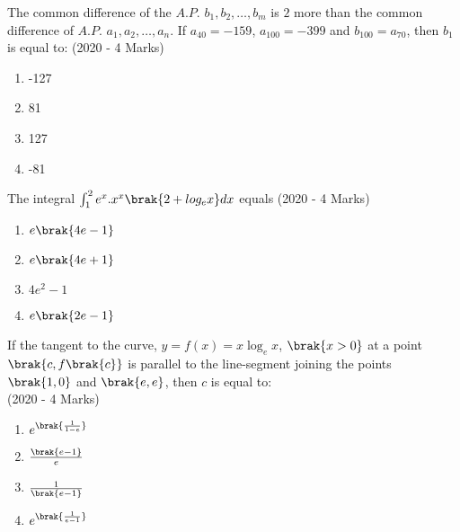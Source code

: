     \item{
     
            The common difference of the $A.P.$ $b_1, b_2, \ldots, b_m$ is $2$ more than the common difference of $A.P.$ $a_1, a_2, \ldots, a_n$. If $a_{40} = -159$, $a_{100} = -399$ and $b_{100} = a_{70}$, then $b_1$ is equal to:\hfill
                {(2020 - 4 Marks)}
            \begin{multicols}{4}
                \begin{enumerate}
                    \item -127
                    \item 81
                    \item 127
                    \item -81
                \end{enumerate}
            \end{multicols}
        
        }
    \item{
            The integral $\int_{1}^{2}e^{x}.x^{x}\brak{2+log_{e}x}dx$ equals
           	\hfill
                {(2020 - 4 Marks)}
            
            \begin{multicols}{2}
				\begin{enumerate}
					\item $e\brak{4e-1}$
					\item $e\brak{4e+1}$
					\item $4e^2-1$
					\item $e\brak{2e-1}$
				\end{enumerate}
			\end{multicols}
        
        }
 	\item{
        	If the tangent to the curve, $y = f(x) = x\log_e x$, $\brak{x>0}$ at a point $\brak{c,f\brak{c}}$ is parallel to the line-segment joining the points $\brak{1,0}$ and $\brak{e,e}$, then $c$ is equal to: \\ \text{ }
        	\hfill
        	{(2020 - 4 Marks)}
        	
        	\begin{multicols}{4}
        		\begin{enumerate}
					\item \( e^{\brak{\frac{1}{1-e}}} \)
					\item \( \frac{\brak{e-1}}{e} \)
					\item \( \frac{1}{\brak{e-1}} \)
					\item \( e^{\brak{\frac{1}{e-1}}} \)
        		\end{enumerate}
        	\end{multicols}
        	
        }
